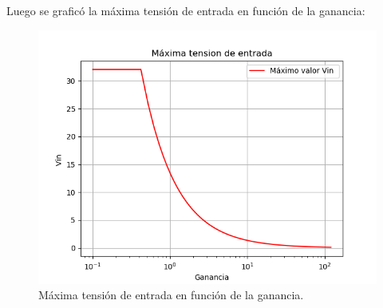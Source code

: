 Luego se graficó la máxima tensión de entrada en función de la ganancia:
\begin{figure}[H]	
	\centering
	\includegraphics[width=\textwidth]{Ejercicio1/Imagenes/maxvin.png}
	\caption{Máxima tensión de entrada en función de la ganancia.}
	\label{fig:MaxVin}
\end{figure} 

